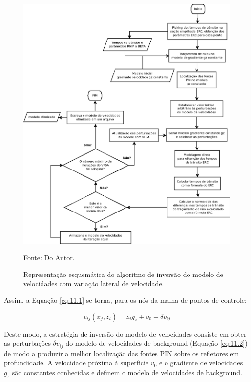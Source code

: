 \begin{figure}[H]
\caption{Representação esquemática do algoritmo de inversão do modelo de velocidades
com variação lateral de velocidade.}
\begin{center}
\includegraphics[scale=0.5]{images/fluxoinv.png}
\vspace{-0.3cm}
\end{center}
\begin{center}
 Fonte: Do Autor.
\end{center}
\label{fig:11.1}
\end{figure}

Assim, a Equação \ref{eq:11.1} se torna, para os nós da malha de pontos de controle:

\begin{equation}
\label{eq:11.2}
v_{ij}(x_j,z_i)=z_i g_z+v_0+\delta v_{ij}
\end{equation}

Deste modo, a estratégia de inversão do modelo de velocidades consiste em obter
as perturbações $\delta v_{ij}$ do modelo de velocidades de background (Equação \ref{eq:11.2})
de modo a produzir a melhor localização das fontes PIN sobre os refletores em profundidade.
A velocidade próxima à superfície $v_0$ e o gradiente de velocidades $g_z$ são constantes conhecidas
e definem o modelo de velocidades de background.

